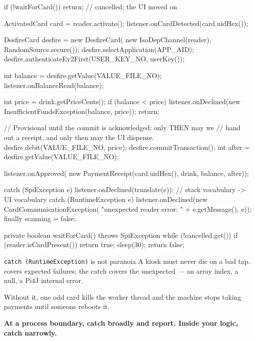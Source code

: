 \begin{jcode}
{{{            if (!waitForCard()) return;         // cancelled; the UI moved on

            ActivatedCard card = reader.activate();
            listener.onCardDetected(card.uidHex());

            DesfireCard desfire = new DesfireCard(
                    new IsoDepChannel(reader), RandomSource.secure());
            desfire.selectApplication(APP_AID);
            desfire.authenticateEv2First(USER_KEY_NO, userKey());

            int balance = desfire.getValue(VALUE_FILE_NO);
            listener.onBalanceRead(balance);

            int price = drink.getPriceCents();
            if (balance < price) {
                listener.onDeclined(new InsufficientFundsException(balance, price));
                return;
            }

            // Provisional until the commit is acknowledged; only THEN may we
            // hand out a receipt, and only then may the UI dispense.
            desfire.debit(VALUE_FILE_NO, price);
            desfire.commitTransaction();
            int after = desfire.getValue(VALUE_FILE_NO);

            listener.onApproved(
                new PaymentReceipt(card.uidHex(), drink, balance, after));

        } catch (SpiException e) {
            listener.onDeclined(translate(e));  // stack vocabulary -> UI vocabulary
        } catch (RuntimeException e) {
            listener.onDeclined(new CardCommunicationException(
                    "unexpected reader error: " + e.getMessage(), e));
        } finally {
            scanning = false;
        }
    }

    private boolean waitForCard() throws SpiException {
        while (!cancelled.get()) {
            if (reader.isCardPresent()) return true;
            sleep(30);
        }
        return false;
    }
}
\end{jcode}

\begin{concept}{\texttt{catch (RuntimeException)} is not paranoia}
A kiosk must never die on a bad tap.  covers expected
failures; the  catch covers the unexpected --- an array
index, a null, a Pi4J internal error.

Without it, one odd card kills the worker thread and the machine stops taking
payments until someone reboots it.

\textbf{At a process boundary, catch broadly and report. Inside your logic, catch
narrowly.}
\end{concept}

